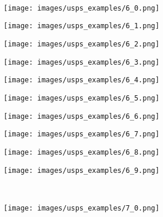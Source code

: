 \begin{figure}[t]
\begin{subfigure}[c]{0.07\textwidth}
 \end{subfigure}
 \\
 \begin{subfigure}[c]{0.07\textwidth}
  \centering
  \texttt{[image: images/usps\_examples/6\_0.png]}
 \end{subfigure}
 \begin{subfigure}[c]{0.07\textwidth}
  \centering
  \texttt{[image: images/usps\_examples/6\_1.png]}
 \end{subfigure}
 \begin{subfigure}[c]{0.07\textwidth}
  \centering
  \texttt{[image: images/usps\_examples/6\_2.png]}
 \end{subfigure}
 \begin{subfigure}[c]{0.07\textwidth}
  \centering
  \texttt{[image: images/usps\_examples/6\_3.png]}
 \end{subfigure}
 \begin{subfigure}[c]{0.07\textwidth}
  \centering
  \texttt{[image: images/usps\_examples/6\_4.png]}
 \end{subfigure}
 \begin{subfigure}[c]{0.07\textwidth}
  \centering
  \texttt{[image: images/usps\_examples/6\_5.png]}
 \end{subfigure}
 \begin{subfigure}[c]{0.07\textwidth}
  \centering
  \texttt{[image: images/usps\_examples/6\_6.png]}
 \end{subfigure}
 \begin{subfigure}[c]{0.07\textwidth}
  \centering
  \texttt{[image: images/usps\_examples/6\_7.png]}
 \end{subfigure}
 \begin{subfigure}[c]{0.07\textwidth}
  \centering
  \texttt{[image: images/usps\_examples/6\_8.png]}
 \end{subfigure}
 \begin{subfigure}[c]{0.07\textwidth}
  \centering
  \texttt{[image: images/usps\_examples/6\_9.png]}
 \end{subfigure}
 \\
 \begin{subfigure}[c]{0.07\textwidth}
  \centering
  \texttt{[image: images/usps\_examples/7\_0.png]}
 \end{subfigure}
 \begin{subfigure}[c]{0.07\textwidth}
  \centering

\end{subfigure}
\end{figure}
